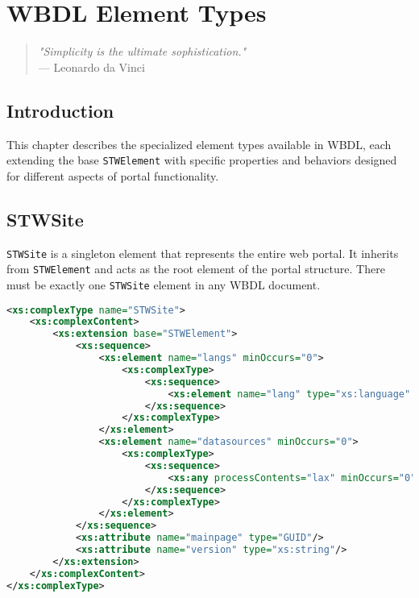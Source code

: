 \chapter{WBDL Element Types}
\label{chap:wbdl-elements}

\begin{quote}
\textit{"Simplicity is the ultimate sophistication."} \\
— Leonardo da Vinci
\end{quote}

\section{Introduction}

This chapter describes the specialized element types available in WBDL, each extending the base \texttt{STWElement} with specific properties and behaviors designed for different aspects of portal functionality.

\section{STWSite}

\texttt{STWSite} is a singleton element that represents the entire web portal. It inherits from \texttt{STWElement} and acts as the root element of the portal structure. There must be exactly one \texttt{STWSite} element in any WBDL document.

\begin{lstlisting}[language=XML,caption={STWSite XSD Definition}]
<xs:complexType name="STWSite">
    <xs:complexContent>
        <xs:extension base="STWElement">
            <xs:sequence>
                <xs:element name="langs" minOccurs="0">
                    <xs:complexType>
                        <xs:sequence>
                            <xs:element name="lang" type="xs:language" maxOccurs="unbounded"/>
                        </xs:sequence>
                    </xs:complexType>
                </xs:element>
                <xs:element name="datasources" minOccurs="0">
                    <xs:complexType>
                        <xs:sequence>
                            <xs:any processContents="lax" minOccurs="0" maxOccurs="unbounded"/>
                        </xs:sequence>
                    </xs:complexType>
                </xs:element>
            </xs:sequence>
            <xs:attribute name="mainpage" type="GUID"/>
            <xs:attribute name="version" type="xs:string"/>
        </xs:extension>
    </xs:complexContent>
</xs:complexType>
\end{lstlisting}

